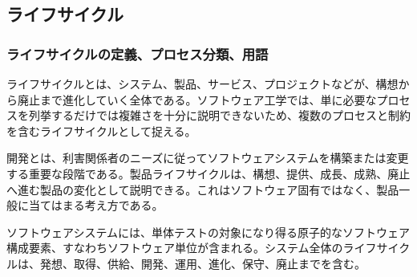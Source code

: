 \subsection{ライフサイクル}
\subsubsection{ライフサイクルの定義、プロセス分類、用語}
ライフサイクルとは、システム、製品、サービス、プロジェクトなどが、構想から廃止まで進化していく全体である。ソフトウェア工学では、単に必要なプロセスを列挙するだけでは複雑さを十分に説明できないため、複数のプロセスと制約を含むライフサイクルとして捉える。

開発とは、利害関係者のニーズに従ってソフトウェアシステムを構築または変更する重要な段階である。製品ライフサイクルは、構想、提供、成長、成熟、廃止へ進む製品の変化として説明できる。これはソフトウェア固有ではなく、製品一般に当てはまる考え方である。

ソフトウェアシステムには、単体テストの対象になり得る原子的なソフトウェア構成要素、すなわちソフトウェア単位が含まれる。システム全体のライフサイクルは、発想、取得、供給、開発、運用、進化、保守、廃止までを含む。

